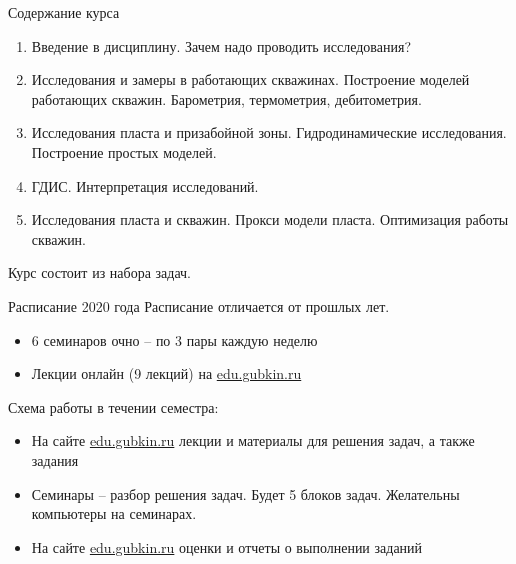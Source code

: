 \begin{frame}
    \titlepage
\end{frame}

\begin{frame}{Содержание курса}
\begin{enumerate}
    \item Введение в дисциплину. Зачем надо проводить исследования?
    \item Исследования и замеры в работающих скважинах. Построение моделей работающих скважин. Барометрия, термометрия, дебитометрия.
    \item Исследования пласта и призабойной зоны. Гидродинамические исследования. Построение простых моделей.
    \item ГДИС. Интерпретация исследований.
    \item Исследования пласта и скважин. Прокси модели пласта. Оптимизация работы скважин.
\end{enumerate}
Курс состоит из набора задач.
\end{frame}

\begin{frame}{Расписание 2020 года}
Расписание отличается от прошлых лет.
\begin{itemize}
    \item 6 семинаров очно -- по 3 пары каждую неделю 
    \item Лекции онлайн (9 лекций) на \href{edu.gubkin.ru}{edu.gubkin.ru} 
\end{itemize}

Схема работы в течении семестра:
\begin{itemize}
    \item На сайте \href{edu.gubkin.ru}{edu.gubkin.ru} лекции и материалы для решения задач, а также задания
    \item Семинары -- разбор решения задач. Будет 5 блоков задач. Желательны компьютеры на семинарах. 
    \item На сайте \href{edu.gubkin.ru}{edu.gubkin.ru} оценки и отчеты о выполнении заданий
\end{itemize}

\end{frame}

